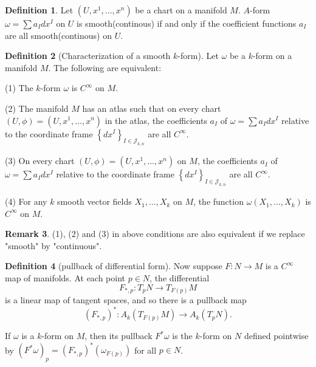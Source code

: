 \documentclass[12pt,a4paper]{book}
\theoremstyle{definition}
\newtheorem{defn}{Definition}[section]
\newtheorem{rema}[defn]{Remark}
\begin{document}
\begin{defn}
    Let $\left(U, x^1, \ldots, x^n\right)$ be a chart on a manifold $M$.
    $A$-form $\omega=\sum a_I d x^I$ on $U$ is smooth(continous) if and only if the coefficient functions $a_I$ are all smooth(continous) on $U$.
\end{defn}
\begin{defn}[Characterization of a smooth $k$-form]
    Let $\omega$ be a $k$-form on a manifold $M$. The following are equivalent:

    (1) The $k$-form $\omega$ is $C^{\infty}$ on $M$.

    (2) The manifold $M$ has an atlas such that on every chart $(U, \phi)=\left(U, x^1, \ldots, x^n\right)$ in the atlas, the coefficients $a_I$ of $\omega=\sum a_I d x^I$ relative to the coordinate frame $\left\{d x^I\right\}_{I \in \mathcal{J}_{k, n}}$ are all $C^{\infty}$.

    (3) On every chart $(U, \phi)=\left(U, x^1, \ldots, x^n\right)$ on $M$, the coefficients $a_I$ of $\omega=\sum a_I d x^I$ relative to the coordinate frame $\left\{d x^I\right\}_{I \in \mathcal{J}_{k, n}}$ are all $C^{\infty}$.

    (4) For any $k$ smooth vector fields $X_1, \ldots, X_k$ on $M$, the function $\omega\left(X_1, \ldots, X_k\right)$ is $C^{\infty}$ on $M$.
\end{defn}
\begin{rema}
    (1), (2) and (3) in above conditions are also equivalent if we replace "smooth" by "continuous".
\end{rema}
\begin{defn}[pullback of differential form]
    Now suppose $F: N \rightarrow M$ is a $C^{\infty}$ map of manifolds. At each point $p \in N$, the differential
    $$
        F_{*, p}: T_p N \rightarrow T_{F(p)} M
    $$
    is a linear map of tangent spaces, and so there is a pullback map
    $$
        \left(F_{*, p}\right)^*: A_k\left(T_{F(p)} M\right) \rightarrow A_k\left(T_p N\right) .
    $$

    If $\omega$ is a $k$-form on $M$, then its pullback $F^* \omega$ is the $k$-form on $N$ defined pointwise by $\left(F^* \omega\right)_p= \left(F_{*, p}\right)^*\left(\omega_{F(p)}\right)$ for all $p \in N$.
\end{defn}
\end{document}

